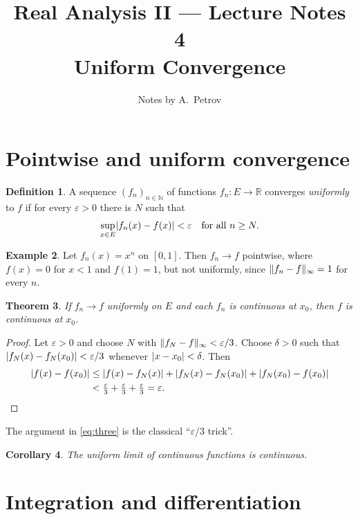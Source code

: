 \documentclass[11pt]{article}
\title{Real Analysis II --- Lecture Notes 4\\\large Uniform Convergence}
\author{Notes by A.~Petrov}
\date{}
\theoremstyle{plain}
\newtheorem{theorem}{Theorem}[section]
\newtheorem{corollary}[theorem]{Corollary}
\theoremstyle{definition}
\newtheorem{definition}[theorem]{Definition}
\newtheorem{example}[theorem]{Example}
\DeclarePairedDelimiter{\abs}{\lvert}{\rvert}
\DeclarePairedDelimiter{\norm}{\lVert}{\rVert}
\newcommand{\N}{\mathbb{N}}
\newcommand{\R}{\mathbb{R}}
\begin{document}
\maketitle

\section{Pointwise and uniform convergence}

\begin{definition}\label{def:unif}
A sequence $(f_n)_{n\in\N}$ of functions $f_n\colon E\to\R$ converges \emph{uniformly}
to $f$ if for every $\varepsilon>0$ there is $N$ such that
\[
  \sup_{x\in E}\abs{f_n(x)-f(x)} < \varepsilon \quad\text{for all } n\ge N.
\]
\end{definition}

\begin{example}
Let $f_n(x) = x^n$ on $[0,1]$. Then $f_n\to f$ pointwise, where $f(x)=0$ for $x<1$ and
$f(1)=1$, but not uniformly, since $\norm{f_n-f}_\infty = 1$ for every $n$.
\end{example}

\begin{theorem}\label{thm:cont}
If $f_n\to f$ uniformly on $E$ and each $f_n$ is continuous at $x_0$, then $f$ is
continuous at $x_0$.
\end{theorem}

\begin{proof}
Let $\varepsilon>0$ and choose $N$ with $\norm{f_N-f}_\infty<\varepsilon/3$. Choose
$\delta>0$ such that $\abs{f_N(x)-f_N(x_0)}<\varepsilon/3$ whenever
$\abs{x-x_0}<\delta$. Then
\begin{align}
\abs{f(x)-f(x_0)}
 &\le \abs{f(x)-f_N(x)} + \abs{f_N(x)-f_N(x_0)} + \abs{f_N(x_0)-f(x_0)} \notag\\
 &< \tfrac{\varepsilon}{3}+\tfrac{\varepsilon}{3}+\tfrac{\varepsilon}{3} = \varepsilon. \label{eq:three}
\end{align}
\end{proof}

The argument in \eqref{eq:three} is the classical ``$\varepsilon/3$ trick''.

\begin{corollary}
The uniform limit of continuous functions is continuous.
\end{corollary}

\section{Integration and differentiation}
\end{document}
